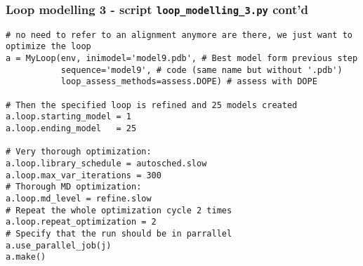 \begin{frame}[fragile]
\frametitle{Loop modelling 3 - script \texttt{loop\_modelling\_3.py} cont'd}
\begin{lstlisting}
# no need to refer to an alignment anymore are there, we just want to optimize the loop
a = MyLoop(env, inimodel='model9.pdb', # Best model form previous step
           sequence='model9', # code (same name but without '.pdb')
           loop_assess_methods=assess.DOPE) # assess with DOPE  
              
# Then the specified loop is refined and 25 models created
a.loop.starting_model = 1
a.loop.ending_model   = 25

# Very thorough optimization:
a.loop.library_schedule = autosched.slow
a.loop.max_var_iterations = 300
# Thorough MD optimization:
a.loop.md_level = refine.slow
# Repeat the whole optimization cycle 2 times
a.loop.repeat_optimization = 2
# Specify that the run should be in parrallel
a.use_parallel_job(j) 
a.make()
\end{lstlisting}
\end{frame}
